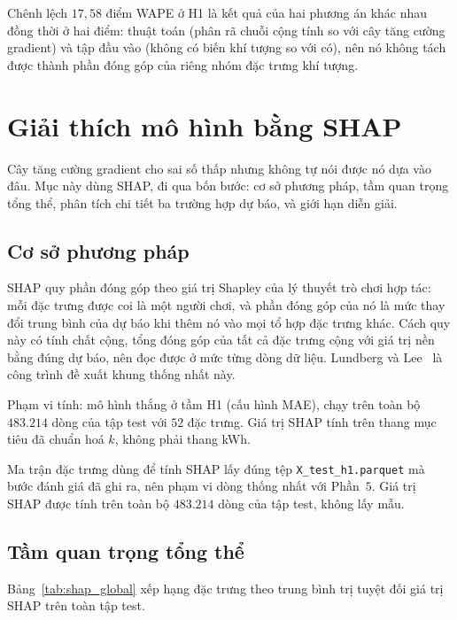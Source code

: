 \documentclass[12pt, a4paper]{report}
\begin{document}
Chênh lệch $17{,}58$ điểm WAPE ở H1 là kết quả của hai phương án khác nhau đồng thời ở hai
điểm: thuật toán (phân rã chuỗi cộng tính so với cây tăng cường gradient) và tập đầu vào
(không có biến khí tượng so với có), nên nó không tách được thành phần đóng góp của riêng
nhóm đặc trưng khí tượng.


\FloatBarrier
\section{Giải thích mô hình bằng SHAP}
\label{sec:giai_thich_mo_hinh}

Cây tăng cường gradient cho sai số thấp nhưng không tự nói được nó dựa vào đâu. Mục này dùng
SHAP, đi qua bốn bước: cơ sở phương pháp, tầm quan trọng tổng thể, phân tích chi tiết ba trường hợp dự báo, và
giới hạn diễn giải.

\FloatBarrier
\subsection{Cơ sở phương pháp}

SHAP quy phần đóng góp theo giá trị Shapley của lý thuyết trò chơi hợp tác: mỗi đặc trưng được
coi là một người chơi, và phần đóng góp của nó là mức thay đổi trung bình của dự báo khi thêm
nó vào mọi tổ hợp đặc trưng khác. Cách quy này có tính chất cộng, tổng đóng góp của tất cả
đặc trưng cộng với giá trị nền bằng đúng dự báo, nên đọc được ở mức từng dòng dữ liệu.
Lundberg và Lee~\cite{lundberg2017shap} là công trình đề xuất khung thống nhất này.



Phạm vi tính: mô hình thắng ở tầm H1 (cấu hình MAE), chạy trên toàn bộ $483.214$ dòng của tập
test với $52$ đặc trưng. Giá trị SHAP tính trên thang mục tiêu đã chuẩn hoá $k$, không phải
thang kWh.

Ma trận đặc trưng dùng để tính SHAP lấy đúng tệp \texttt{X\_test\_h1.parquet} mà bước đánh giá đã
ghi ra, nên phạm vi dòng thống nhất với Phần~$5$. Giá trị SHAP được tính trên toàn bộ
$483.214$ dòng của tập test, không lấy mẫu.

\FloatBarrier
\subsection{Tầm quan trọng tổng thể}

Bảng~\ref{tab:shap_global} xếp hạng đặc trưng theo
trung bình trị tuyệt đối giá trị SHAP trên toàn tập test.
\end{document}
